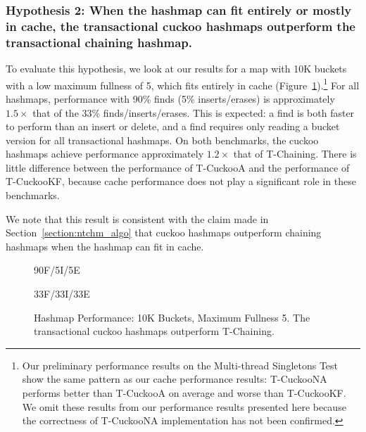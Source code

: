 \subsubsection{Hypothesis 2: When the hashmap can fit entirely or mostly in cache, the transactional cuckoo hashmaps outperform the transactional chaining hashmap.}

To evaluate this hypothesis, we look at our results for a map with 10K buckets with a low maximum fullness of 5, which fits entirely in cache (Figure~\ref{fig:hm_5}).\footnote{Our preliminary performance results on the Multi-thread Singletons Test show the same pattern as our cache performance results: T-CuckooNA performs better than T-CuckooA on average and worse than T-CuckooKF. We omit these results from our performance results presented here because the correctness of T-CuckooNA implementation has not been confirmed.}
For all hashmaps, performance with 90\% finds (5\% inserts/erases) is approximately $1.5\times$ that of the 33\% finds/inserts/erases. This is expected: a find is both faster to perform than an insert or delete, and a find requires only reading a bucket version for all transactional hashmaps.
On both benchmarks, the cuckoo hashmaps achieve performance approximately $1.2\times$ that of T-Chaining. There is little difference between the performance of T-CuckooA and the performance of T-CuckooKF, because cache performance does not play a significant role in these benchmarks.

We note that this result is consistent with the claim made in Section~\ref{section:ntchm_algo} that cuckoo hashmaps outperform chaining hashmaps when the hashmap can fit in cache. 

\vspace{12pt}
\noindent{}

\begin{figure}[H]
    \centering
    \begin{minipage}{0.75\textwidth}
	\caption*{90F/5I/5E}
        \vspace{12pt}
    \end{minipage}
    \begin{minipage}{0.75\textwidth}
	\caption*{33F/33I/33E}
    \end{minipage}
    \caption[Hashmap Performance: 10K Buckets, Maximum Fullness 5]{Hashmap Performance: 10K Buckets, Maximum Fullness 5. The transactional cuckoo hashmaps outperform T-Chaining.}
    \label{fig:hm_5}
\end{figure}


